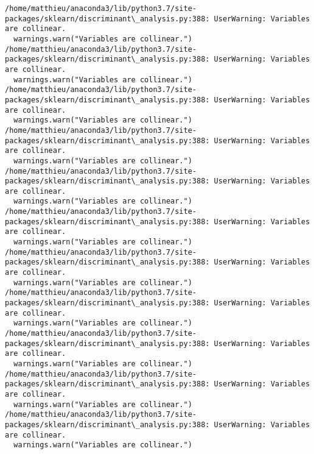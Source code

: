 \documentclass[11pt]{article}
\begin{document}
    \begin{Verbatim}[commandchars=\\\{\}]
/home/matthieu/anaconda3/lib/python3.7/site-packages/sklearn/discriminant\_analysis.py:388: UserWarning: Variables are collinear.
  warnings.warn("Variables are collinear.")
/home/matthieu/anaconda3/lib/python3.7/site-packages/sklearn/discriminant\_analysis.py:388: UserWarning: Variables are collinear.
  warnings.warn("Variables are collinear.")
/home/matthieu/anaconda3/lib/python3.7/site-packages/sklearn/discriminant\_analysis.py:388: UserWarning: Variables are collinear.
  warnings.warn("Variables are collinear.")
/home/matthieu/anaconda3/lib/python3.7/site-packages/sklearn/discriminant\_analysis.py:388: UserWarning: Variables are collinear.
  warnings.warn("Variables are collinear.")
/home/matthieu/anaconda3/lib/python3.7/site-packages/sklearn/discriminant\_analysis.py:388: UserWarning: Variables are collinear.
  warnings.warn("Variables are collinear.")
/home/matthieu/anaconda3/lib/python3.7/site-packages/sklearn/discriminant\_analysis.py:388: UserWarning: Variables are collinear.
  warnings.warn("Variables are collinear.")
/home/matthieu/anaconda3/lib/python3.7/site-packages/sklearn/discriminant\_analysis.py:388: UserWarning: Variables are collinear.
  warnings.warn("Variables are collinear.")
/home/matthieu/anaconda3/lib/python3.7/site-packages/sklearn/discriminant\_analysis.py:388: UserWarning: Variables are collinear.
  warnings.warn("Variables are collinear.")
/home/matthieu/anaconda3/lib/python3.7/site-packages/sklearn/discriminant\_analysis.py:388: UserWarning: Variables are collinear.
  warnings.warn("Variables are collinear.")
/home/matthieu/anaconda3/lib/python3.7/site-packages/sklearn/discriminant\_analysis.py:388: UserWarning: Variables are collinear.
  warnings.warn("Variables are collinear.")
/home/matthieu/anaconda3/lib/python3.7/site-packages/sklearn/discriminant\_analysis.py:388: UserWarning: Variables are collinear.
  warnings.warn("Variables are collinear.")

    \end{Verbatim}

    \begin{center}
    \end{center}
    { \hspace*{\fill} \\}
    
    \begin{center}
    \end{center}
    { \hspace*{\fill} \\}
    
\end{document}
